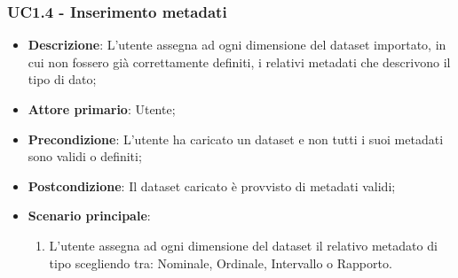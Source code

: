 \subsubsection{UC1.4 - Inserimento metadati}
\label{ssub:uc1.4}
\begin{itemize}
    \item \textbf{Descrizione}: L'utente assegna ad ogni dimensione del dataset importato, in cui non fossero già 
    correttamente definiti, i relativi metadati che descrivono il tipo di dato;

    \item \textbf{Attore primario}: Utente;
    
    \item \textbf{Precondizione}:   L'utente ha caricato un dataset e non tutti i suoi metadati sono validi o definiti;
    \item \textbf{Postcondizione}:  Il dataset caricato è provvisto di metadati validi;

	\item \textbf{Scenario principale}:
		\begin{enumerate}
            \item L'utente assegna ad ogni dimensione del dataset il relativo metadato di tipo scegliendo tra:
                    Nominale, Ordinale, Intervallo o Rapporto.
        \end{enumerate}

\end{itemize}

